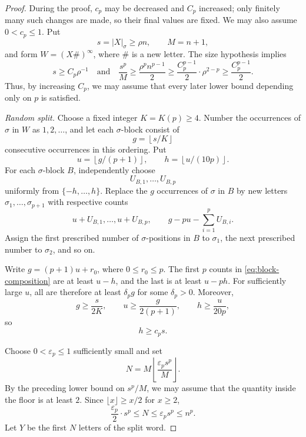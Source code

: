 \documentclass[11pt]{article}
\theoremstyle{plain}
\theoremstyle{definition}
\theoremstyle{remark}
\newcommand{\floor}[1]{\left\lfloor #1\right\rfloor}
\begin{document}
\begin{proof}
During the proof, \(c_p\) may be decreased and \(C_p\) increased; only finitely many such changes are made, so their final values are fixed. We may also assume \(0<c_p\le1\). Put
\[
        s=|X|_\sigma\ge\rho n,
        \qquad
        M=n+1,
\]
and form \(W=(X\#)^\infty\), where \(\#\) is a new letter. The size hypothesis implies
\[
        s\ge C_p\rho^{-1}
        \quad\text{and}\quad
        \frac{s^p}{M}
        \ge \frac{\rho^pn^{p-1}}{2}
        \ge \frac{C_p^{p-1}}{2}\cdot\rho^{2-p}
        \ge \frac{C_p^{p-1}}{2}.
\]
Thus, by increasing \(C_p\), we may assume that every later lower bound depending only on \(p\) is satisfied.

\emph{Random split.}
Choose a fixed integer \(K=K(p)\ge4\). Number the occurrences of \(\sigma\) in \(W\) as \(1,2,\ldots\), and let each \(\sigma\)-block consist of
\[
        g=\floor{s/K}
\]
consecutive occurrences in this ordering. Put
\[
        u=\floor{g/(p+1)},
        \qquad
        h=\floor{u/(10p)}.
\]
For each \(\sigma\)-block \(B\), independently choose
\[
        U_{B,1},\ldots,U_{B,p}
\]
uniformly from \(\{-h,\ldots,h\}\). Replace the \(g\) occurrences of \(\sigma\) in \(B\) by new letters \(\sigma_1,\ldots,\sigma_{p+1}\) with respective counts
\begin{equation}\label{eq:block-composition}
        u+U_{B,1},\ldots,u+U_{B,p},
        \qquad
        g-pu-\sum_{i=1}^pU_{B,i}.
\end{equation}
Assign the first prescribed number of \(\sigma\)-positions in \(B\) to \(\sigma_1\), the next prescribed number to \(\sigma_2\), and so on.

Write \(g=(p+1)u+r_0\), where \(0\le r_0\le p\). The first \(p\) counts in \eqref{eq:block-composition} are at least \(u-h\), and the last is at least \(u-ph\). For sufficiently large \(u\), all are therefore at least \(\delta_pg\) for some \(\delta_p>0\). Moreover,
\[
        g\ge \frac{s}{2K},\qquad
        u\ge \frac{g}{2(p+1)},\qquad
        h\ge \frac{u}{20p},
\]
so
\begin{equation}\label{eq:h-comparable-s}
        h\ge c_ps.
\end{equation}

Choose \(0<\varepsilon_p\le1\) sufficiently small and set
\begin{equation}\label{eq:amplifier-length}
        N=M\floor{\frac{\varepsilon_ps^p}{M}}.
\end{equation}
By the preceding lower bound on \(s^p/M\), we may assume that the quantity inside the floor is at least \(2\). Since \(\lfloor x\rfloor\ge x/2\) for \(x\ge2\),
\begin{equation}\label{eq:N-bounds}
        \frac{\varepsilon_p}{2}\cdot s^p\le N\le \varepsilon_ps^p\le n^p.
\end{equation}
Let \(Y\) be the first \(N\) letters of the split word.


\end{proof}
\end{document}
